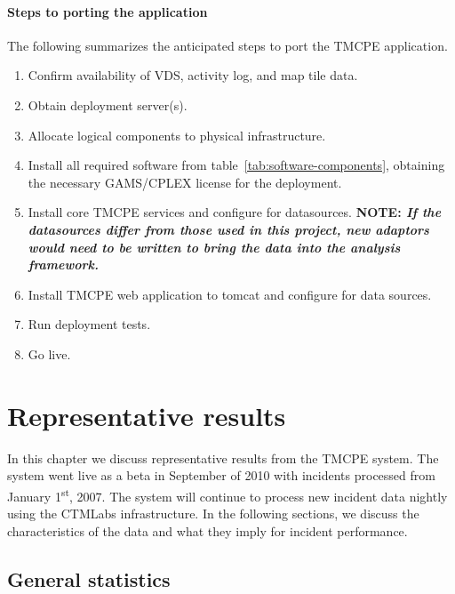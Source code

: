 \documentclass[12pt]{report}
\begin{document}
\subsubsection{Steps to porting the application}
\label{sec:portability-general}

The following summarizes the anticipated steps to port the \ac{TMCPE} application.
\begin{enumerate}
\item Confirm availability of \ac{VDS}, activity log, and map tile data.
\item Obtain deployment server(s).
\item Allocate logical components to physical infrastructure.
\item Install all required software from table~\ref{tab:software-components},
  obtaining the necessary \ac{GAMS}/\ac{CPLEX} license for the deployment.
\item Install core \ac{TMCPE} services and configure for datasources.
  \textbf{NOTE: \emph{If the datasources differ from those used in this project, new
  adaptors would need to be written to bring the data into the analysis
  framework.}}
\item Install \ac{TMCPE} web application to tomcat and configure for data sources.
\item Run deployment tests.
\item Go live.
\end{enumerate}



\chapter{Representative results}
\label{chap:results}

In this chapter we discuss representative results from the \ac{TMCPE} system.
The system went live as a beta in September of 2010 with incidents processed
from January 1\textsuperscript{st}, 2007.  The system will continue to process
new incident data nightly using the \ac{CTMLabs} infrastructure.  In the
following sections, we discuss the characteristics of the data and what they
imply for incident performance.

\section{General statistics}
\label{sec:general-stats}
\end{document}
